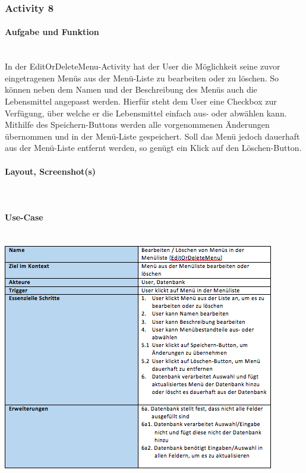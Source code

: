 \subsubsection{Activity 8}

\paragraph{Aufgabe und Funktion}\\
In der EditOrDeleteMenu-Activity hat der User die Möglichkeit seine zuvor eingetragenen Menüs aus der Menü-Liste zu bearbeiten oder zu löschen. So können neben dem Namen und der Beschreibung des Menüs auch die Lebensmittel angepasst werden. Hierfür steht dem User eine Checkbox zur Verfügung, über welche er die Lebensmittel einfach aus- oder abwählen kann. Mithilfe des Speichern-Buttons werden alle vorgenommenen Änderungen übernommen und in der Menü-Liste gespeichert. Soll das Menü jedoch dauerhaft aus der Menü-Liste entfernt werden, so genügt ein Klick auf den Löschen-Button.

\paragraph{Layout, Screenshot(s)}\\
\paragraph{Use-Case}$~~$\\
\newline
\includegraphics[scale=1]{img/usecaseeodmenu}\\
